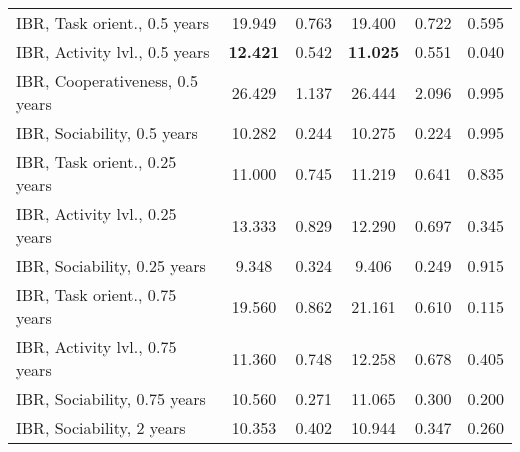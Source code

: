 \begin{tabular}{l c c c c c}
IBR, Task orient., 0.5 years & 19.949 & 0.763 &  19.400 & 0.722 & 0.595 \\
IBR, Activity lvl., 0.5 years & \textbf{12.421} & 0.542 &  \textbf{11.025} & 0.551 & 0.040 \\
IBR, Cooperativeness, 0.5 years & 26.429 & 1.137 &  26.444 & 2.096 & 0.995 \\
IBR, Sociability, 0.5 years & 10.282 & 0.244 &  10.275 & 0.224 & 0.995 \\
IBR, Task orient., 0.25 years & 11.000 & 0.745 &  11.219 & 0.641 & 0.835 \\
IBR, Activity lvl., 0.25 years & 13.333 & 0.829 &  12.290 & 0.697 & 0.345 \\
IBR, Sociability, 0.25 years & 9.348 & 0.324 &  9.406 & 0.249 & 0.915 \\
IBR, Task orient., 0.75 years & 19.560 & 0.862 &  21.161 & 0.610 & 0.115 \\
IBR, Activity lvl., 0.75 years & 11.360 & 0.748 &  12.258 & 0.678 & 0.405 \\
IBR, Sociability, 0.75 years & 10.560 & 0.271 &  11.065 & 0.300 & 0.200 \\
IBR, Sociability, 2 years & 10.353 & 0.402 &  10.944 & 0.347 & 0.260 \\
\bottomrule
\end{tabular}
